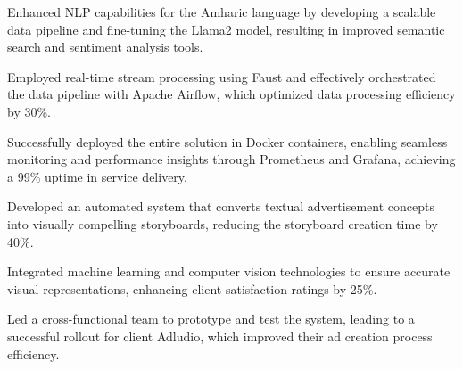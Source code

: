 \documentclass[10pt, A4]{classic}
\begin{document}
    \begin{highlights}
            \item Enhanced NLP capabilities for the Amharic language by developing a scalable data pipeline and fine{-}tuning the Llama2 model, resulting in improved semantic search and sentiment analysis tools.
            \item Employed real{-}time stream processing using Faust and effectively orchestrated the data pipeline with Apache Airflow, which optimized data processing efficiency by 30\%.
            \item Successfully deployed the entire solution in Docker containers, enabling seamless monitoring and performance insights through Prometheus and Grafana, achieving a 99\% uptime in service delivery.
        \end{highlights}
    \begin{highlights}
            \item Developed an automated system that converts textual advertisement concepts into visually compelling storyboards, reducing the storyboard creation time by 40\%.
            \item Integrated machine learning and computer vision technologies to ensure accurate visual representations, enhancing client satisfaction ratings by 25\%.
            \item Led a cross{-}functional team to prototype and test the system, leading to a successful rollout for client Adludio, which improved their ad creation process efficiency.
        \end{highlights}





\end{document}
